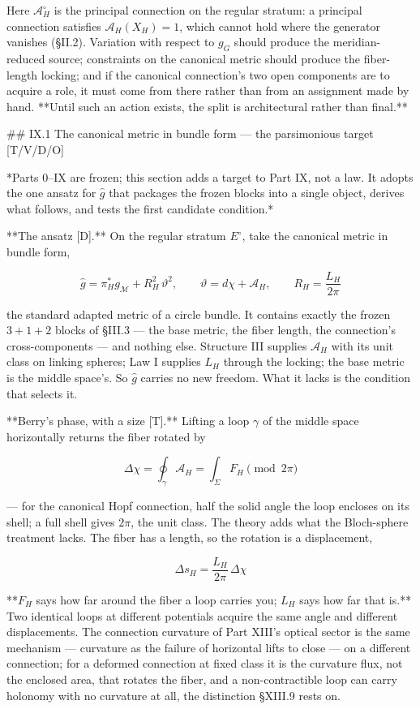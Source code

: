 Here $\mathcal A_H^{\circ}$ is the principal connection on the regular stratum: a principal connection satisfies $\mathcal A_H(X_H) = 1$, which cannot hold where the generator vanishes (§II.2). Variation with respect to $g_G$ should produce the meridian-reduced source; constraints on the canonical metric should produce the fiber-length locking; and if the canonical connection's two open components are to acquire a role, it must come from there rather than from an assignment made by hand. **Until such an action exists, the split is architectural rather than final.**

## IX.1 The canonical metric in bundle form — the parsimonious target [T/V/D/O]

*Parts 0–IX are frozen; this section adds a target to Part IX, not a law. It adopts the one ansatz for $\hat g$ that packages the frozen blocks into a single object, derives what follows, and tests the first candidate condition.*

**The ansatz [D].** On the regular stratum $E^\circ$, take the canonical metric in bundle form,

$$\hat g = \pi_H^*g_{\mathcal M} + R_H^2\,\vartheta^2,\qquad \vartheta = d\chi+\mathcal A_H,\qquad R_H = \frac{L_H}{2\pi}$$

the standard adapted metric of a circle bundle. It contains exactly the frozen $3+1+2$ blocks of §III.3 — the base metric, the fiber length, the connection's cross-components — and nothing else. Structure III supplies $\mathcal A_H$ with its unit class on linking spheres; Law I supplies $L_H$ through the locking; the base metric is the middle space's. So $\hat g$ carries no new freedom. What it lacks is the condition that selects it.

**Berry's phase, with a size [T].** Lifting a loop $\gamma$ of the middle space horizontally returns the fiber rotated by

$$\Delta\chi = \oint_\gamma\mathcal A_H = \int_\Sigma F_H\pmod{2\pi}$$

— for the canonical Hopf connection, half the solid angle the loop encloses on its shell; a full shell gives $2\pi$, the unit class. The theory adds what the Bloch-sphere treatment lacks. The fiber has a length, so the rotation is a displacement,

$$\Delta s_H = \frac{L_H}{2\pi}\,\Delta\chi$$

**$F_H$ says how far around the fiber a loop carries you; $L_H$ says how far that is.** Two identical loops at different potentials acquire the same angle and different displacements. The connection curvature of Part XIII's optical sector is the same mechanism — curvature as the failure of horizontal lifts to close — on a different connection; for a deformed connection at fixed class it is the curvature flux, not the enclosed area, that rotates the fiber, and a non-contractible loop can carry holonomy with no curvature at all, the distinction §XIII.9 rests on.

